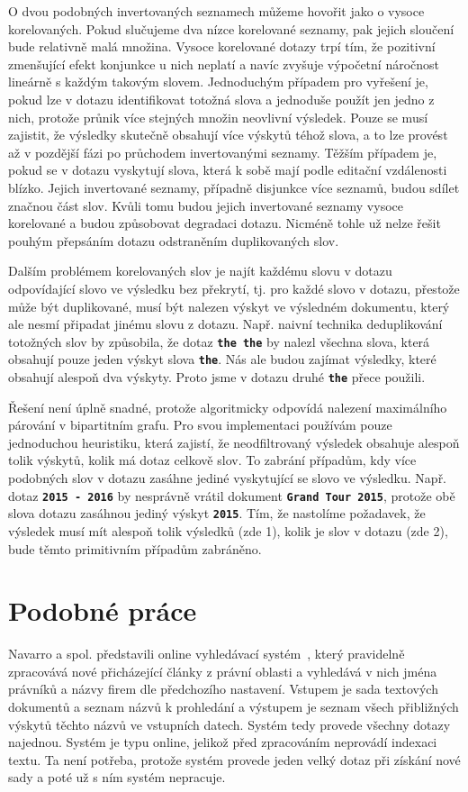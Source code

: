 \documentclass[11pt,letterpaper,oneside,openright]{book}
\newcommand{\bftt}[1]{\texttt{\textbf{#1}}}
\begin{document}
O dvou podobných invertovaných seznamech můžeme hovořit jako o vysoce
korelovaných. Pokud slučujeme dva nízce korelované seznamy, pak jejich sloučení
bude relativně malá množina. Vysoce korelované dotazy trpí tím, že pozitivní
zmenšující efekt konjunkce u nich neplatí a navíc zvyšuje výpočetní náročnost
lineárně s každým takovým slovem.  Jednoduchým případem pro vyřešení je, pokud
lze v dotazu identifikovat totožná slova a jednoduše použít jen jedno z nich,
protože průnik více stejných množin neovlivní výsledek. Pouze se musí zajistit,
že výsledky skutečně obsahují více výskytů téhož slova, a to lze provést až v
pozdější fázi po průchodem invertovanými seznamy.  Těžším případem je, pokud se
v dotazu vyskytují slova, která k sobě mají podle editační vzdálenosti blízko.
Jejich invertované seznamy, případně disjunkce více seznamů, budou sdílet
značnou část slov. Kvůli tomu budou jejich invertované seznamy vysoce
korelované a budou způsobovat degradaci dotazu.  Nicméně tohle už nelze řešit
pouhým přepsáním dotazu odstraněním duplikovaných slov.

Dalším problémem korelovaných slov je najít každému slovu v dotazu odpovídající
slovo ve výsledku bez překrytí, tj. pro každé slovo v dotazu, přestože může být
duplikované, musí být nalezen výskyt ve výsledném dokumentu, který ale nesmí
připadat jinému slovu z dotazu. Např. naivní technika deduplikování totožných
slov by způsobila, že dotaz \bftt{the the} by nalezl všechna slova, která
obsahují pouze jeden výskyt slova \bftt{the}. Nás ale budou zajímat výsledky,
které obsahují alespoň dva výskyty. Proto jsme v dotazu druhé \bftt{the} přece
použili.

Řešení není úplně snadné, protože algoritmicky odpovídá nalezení maximálního
párování v bipartitním grafu. Pro svou implementaci používám pouze jednoduchou
heuristiku, která zajistí, že neodfiltrovaný výsledek obsahuje alespoň tolik
výskytů, kolik má dotaz celkově slov. To zabrání případům, kdy více podobných
slov v dotazu zasáhne jediné vyskytující se slovo ve výsledku. Např. dotaz
\bftt{2015 - 2016} by nesprávně vrátil dokument \bftt{Grand Tour 2015}, protože
obě slova dotazu zasáhnou jediný výskyt \bftt{2015}. Tím, že nastolíme
požadavek, že výsledek musí mít alespoň tolik výsledků (zde 1), kolik je slov v
dotazu (zde 2), bude těmto primitivním případům zabráněno.

\section{Podobné práce}
Navarro a spol. představili online vyhledávací
systém~\cite{Navarro:2003:MFA:638683.638685}, který pravidelně zpracovává nové
přicházející články z právní oblasti a vyhledává v nich jména právníků a názvy
firem dle předchozího nastavení. Vstupem je sada textových dokumentů a seznam
názvů k prohledání a výstupem je seznam všech přibližných výskytů těchto názvů
ve vstupních datech. Systém tedy provede všechny dotazy najednou. Systém je
typu online, jelikož před zpracováním neprovádí indexaci textu. Ta není
potřeba, protože systém provede jeden velký dotaz při získání nové sady a poté
už s ním systém nepracuje.
\end{document}
